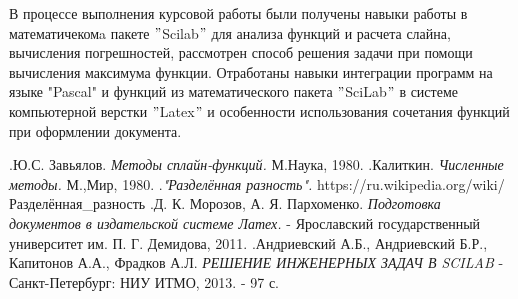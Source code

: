 \documentclass[russian,utf8,nocolumnxxxi,nocolumnxxxii]{eskdtext}
\begin{document}
В процессе выполнения курсовой работы были получены навыки работы в математичекомa пакете $"$Scilab$"$ для анализа функций и расчета слайна, вычисления погрешностей, рассмотрен способ решения задачи при помощи вычисления максимума функции. Отработаны навыки интеграции программ на языке "Pascal" и функций из математического пакета $"$SciLab$"$ в системе компьютерной верстки $"$Latex$"$ и особенности использования сочетания функций при оформлении документа.
\begin{thebibliography}{}
    \bibitem .Ю.С. Завьялов. \textit{Методы сплайн-функций.} М.Наука, 1980.
    \bibitem .Калиткин. \textit{Численные методы.} М.,Мир, 1980.
    \bibitem  .\textit{"Разделённая разность".} https://ru.wikipedia.org/wiki/Разделённая\_разность
    \bibitem .Д. К. Морозов, А. Я. Пархоменко. \textit{Подготовка документов в издательской системе Латех.} - Ярославский государственный университет им. П. Г. Демидова, 2011.
    \bibitem .Андриевский А.Б., Андриевский Б.Р., Капитонов А.А., Фрадков А.Л. \textit{РЕШЕНИЕ ИНЖЕНЕРНЫХ ЗАДАЧ В SCILAB} - Санкт-Петербург: НИУ ИТМО, 2013. - 97 с.
    \end{thebibliography}
\end{document}
